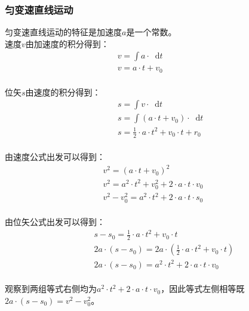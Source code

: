 \documentclass[UTF8]{ctexart}
\newcommand*{\dif}{\mathop{}\!\mathrm{d}}
\begin{document}
\subsubsection{匀变速直线运动}
    \setcounter{equation}{0}
    匀变速直线运动的特征是加速度$a$是一个常数。\\[3mm]
    速度$v$由加速度的积分得到：
    \begin{align}
        &v=\int a\cdot\dif t~~~~~~~~~~~~~~~~~~~~\\[3mm]
        &v=a\cdot t+v_0
    \end{align}\\
    位矢$s$由速度的积分得到：
    \begin{align}        
        &~~s=\int v\cdot\dif t\\[3mm]
        &~~s=\int (a\cdot t+v_0)\cdot\dif t\\[3mm]
        &~~s=\frac{1}{2}\cdot a\cdot t^2+v_0\cdot t+r_0
    \end{align}\\
    由速度公式出发可以得到：
    \begin{align}
        &v^2=(a\cdot t+v_0)^2\\[3mm]
        &v^2=a^2\cdot t^2+v_0^2+2\cdot a\cdot t\cdot v_0\\[3mm]
        &v^2-v_0^2=a^2\cdot t^2+2\cdot a\cdot t\cdot s_0~~~~~~
    \end{align}\\
    由位矢公式出发可以得到：
    \begin{align}
        &~~~~~~s-s_0=\frac{1}{2}\cdot a\cdot t^2+v_0\cdot t\\[3mm]
        &~~~~~~2a\cdot(s-s_0)=2a\cdot\left(\frac{1}{2}\cdot a\cdot t^2+v_0\cdot t\right)\\[3mm]
        &~~~~~~2a\cdot(s-s_0)=a^2\cdot t^2+2\cdot a\cdot t\cdot v_0
    \end{align}\\
    观察到两组等式右侧均为$a^2\cdot t^2+2\cdot a\cdot t\cdot v_0$，因此等式左侧相等既$2a\cdot(s-s_0)=v^2-v_0^2$。

\newpage
    
\end{document}
